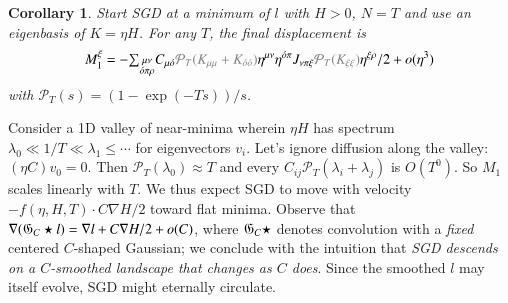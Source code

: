 \documentclass[anon,12pt]{colt2021} %
\newtheorem{cor}{Corollary}
\newcommand{\squish}{\vspace{-0.05cm}}
\newcommand{\squash}{\vspace{-0.15cm}}
\newcommand{\omicron}{{\acute{o}}}
\newcommand{\sizeddia}[2]{%
    \begin{gathered}%
        \texttt{[image: ../diagrams/\#1.png]}%
    \end{gathered}%
}
\newcommand{\sdia}[1]{\protect \sizeddia{#1}{0.10}}
\begin{document}
            \begin{cor}\label{cor:entropic}%
                Start SGD at a minimum of $l$ with $H>0$, $N=T$ and use
                an eigenbasis of $K=\eta H$.  
                For any $T$, the final displacement is
                \squish\squish
                $$
                    M_1^\xi =
                    -
                    {\textstyle\sum_{\substack{\mu\nu    \\ \omicron\pi\rho}}}
                        C_{\mu\omicron}
                        {\color{gray}{\mathcal P}_T(K_{\mu\mu} + K_{\omicron\omicron})}
                        \eta^{\mu\nu}\eta^{\omicron\pi}
                        J_{\nu\pi\xi}
                        {\color{gray}{\mathcal P}_T(K_{\xi\xi})}\eta^{\xi\rho}/2
                    + o(\eta^3)
                    \squish\squish
                $$
                with ${\mathcal P}_T(s) = (1 - \exp(-Ts))/s$.
            \end{cor}\squash\squash

            Consider a 1D valley of near-minima wherein $\eta H$ has spectrum
            $\lambda_0 \ll 1/T \ll \lambda_1 \leq \cdots$ for eigenvectors
            $v_i$.  Let's ignore diffusion along the valley: $(\eta C) v_0 =
            0$.
            Then ${\mathcal P}_T(\lambda_0)\approx T$ and every
            $C_{ij}{\mathcal P}_T(\lambda_i+\lambda_j)$ is $O(T^0)$.  So $M_1$
            scales linearly with $T$.  We thus expect SGD to move with
            velocity $-f(\eta,H,T)\cdot C\nabla H/2$ toward flat minima.  
            Observe that $\nabla ({\frak G}_C \star l) = \nabla l+C\nabla
            H/2 + o(C)$, where ${\frak G}_C \star$ denotes convolution with a
            \emph{fixed} centered $C$-shaped Gaussian; we conclude with the
            intuition that \emph{SGD descends on a $C$-smoothed landscape that
            changes as $C$ does}.  Since the smoothed $l$ may itself evolve,
            SGD might eternally circulate.
      
\end{document}
